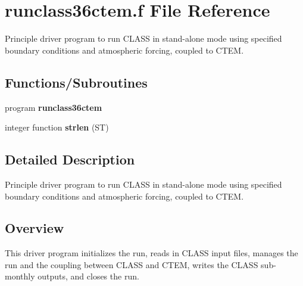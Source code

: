 \hypertarget{runclass36ctem_8f}{}\section{runclass36ctem.\+f File Reference}
\label{runclass36ctem_8f}


Principle driver program to run C\+L\+A\+S\+S in stand-\/alone mode using specified boundary conditions and atmospheric forcing, coupled to C\+T\+E\+M.  


\subsection*{Functions/\+Subroutines}
\begin{DoxyCompactItemize}
\item 
\hypertarget{runclass36ctem_8f_a6d56d6301df42923fa1e8aa2e6c02ec3}{}program {\bfseries runclass36ctem}\label{runclass36ctem_8f_a6d56d6301df42923fa1e8aa2e6c02ec3}

\item 
\hypertarget{runclass36ctem_8f_ae665ea752226de365786f295628b2f4f}{}integer function {\bfseries strlen} (S\+T)\label{runclass36ctem_8f_ae665ea752226de365786f295628b2f4f}

\end{DoxyCompactItemize}


\subsection{Detailed Description}
Principle driver program to run C\+L\+A\+S\+S in stand-\/alone mode using specified boundary conditions and atmospheric forcing, coupled to C\+T\+E\+M. 

\subsection*{Overview}

This driver program initializes the run, reads in C\+L\+A\+S\+S input files, manages the run and the coupling between C\+L\+A\+S\+S and C\+T\+E\+M, writes the C\+L\+A\+S\+S sub-\/monthly outputs, and closes the run. 